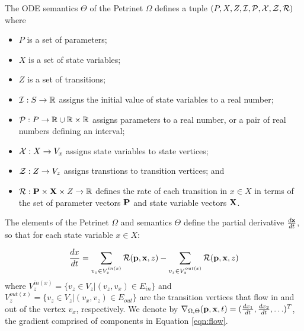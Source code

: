 \begin{definition}
    The ODE semantics $\Theta$ of the Petrinet $\Omega$ defines a tuple $(P, X,
    Z, {\cal I}, {\cal P}, {\cal X}, {\cal Z}, {\cal R})$ where 
    \begin{itemize}
        \item $P$ is a set of parameters;
        \item $X$ is a set of state variables;
        \item $Z$ is a set of transitions;
        \item ${\cal I}: S \rightarrow {\mathbb{R}}$ assigns the initial value of
        state variables to a real number;
        \item ${\cal P}: P \rightarrow {\mathbb{R}} \cup {\mathbb{R}} \times {\mathbb{R}}$ assigns
        parameters to a real number, or a pair of real numbers defining an
        interval;
        \item ${\cal X}: X \rightarrow V_x$ assigns state variables to state
        vertices;
        \item ${\cal Z}: Z \rightarrow V_z$ assigns transtions to transition
        vertices; and
        \item ${\cal R}: {\bf P} \times {\bf X} \times Z \rightarrow {\mathbb{R}}$
        defines the rate of each transition in $x \in X$ in terms of the set of
        parameter vectors ${\bf P}$ and state variable vectors ${\bf X}$.  
    \end{itemize}
    The elements of the Petrinet $\Omega$ and semantics $\Theta$ define the
    partial derivative $\frac{d {\bf x}}{dt}$, so that for each state variable
    $x \in X$:
    
    \begin{equation}\label{eqn:flow}
        \frac{dx}{dt} = \sum_{v_z \in V_z^{in(x)}} {\cal R}({\bf p}, {\bf x}, z) - \sum_{v_z \in V_z^{out(x)} } {\cal R}({\bf p}, {\bf x}, z)
    \end{equation}
\noindent where $V_z^{in(x)} = \{v_z \in V_z | (v_z, v_x) \in E_{in}\}$ and
    $V_z^{out(x)}=\{v_z \in V_z| (v_x, v_z) \in E_{out}\}$ are the transition
    vertices that flow in and out of the vertex $v_x$, respectively. We denote
    by $\nabla_{\Omega, \Theta}({\bf p}, {\bf x}, t) = (\frac{dx_1}{dt},
    \frac{dx_2}{dt}, \ldots)^T$, the gradient comprised of components in
    Equation \eqref{eqn:flow}.
\end{definition}

